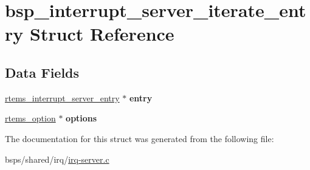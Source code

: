 \hypertarget{structbsp__interrupt__server__iterate__entry}{}\section{bsp\+\_\+interrupt\+\_\+server\+\_\+iterate\+\_\+entry Struct Reference}
\label{structbsp__interrupt__server__iterate__entry}
\subsection*{Data Fields}
\begin{DoxyCompactItemize}
\item 
\mbox{\label{structbsp__interrupt__server__iterate__entry_afdcfab5338b164165b842761f8fcaeb5}} 
\mbox{\hyperlink{structrtems__interrupt__server__entry}{rtems\+\_\+interrupt\+\_\+server\+\_\+entry}} $\ast$ {\bfseries entry}
\item 
\mbox{\label{structbsp__interrupt__server__iterate__entry_a14e9bc17755f6dacb8d8b762d40ddea9}} 
\mbox{\hyperlink{group__ClassicOptions_gad26685eb0e60a9650082935c31920e29}{rtems\+\_\+option}} $\ast$ {\bfseries options}
\end{DoxyCompactItemize}


The documentation for this struct was generated from the following file\+:\begin{DoxyCompactItemize}
\item 
bsps/shared/irq/\mbox{\hyperlink{irq-server_8c}{irq-\/server.\+c}}\end{DoxyCompactItemize}

